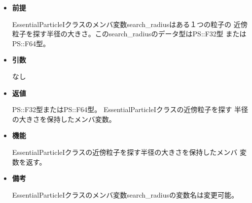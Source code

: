 \begin{itemize}

\item {\bf 前提}

  EssentialParticleIクラスのメンバ変数search\_radiusはある１つの粒子の
  近傍粒子を探す半径の大きさ。このsearch\_radiusのデータ型はPS::F32型
  またはPS::F64型。
  
\item {\bf 引数}

  なし
  
\item {\bf 返値}

  PS::F32型またはPS::F64型。 EssentialParticleIクラスの近傍粒子を探す
  半径の大きさを保持したメンバ変数。
  
\item {\bf 機能}

  EssentialParticleIクラスの近傍粒子を探す半径の大きさを保持したメンバ
  変数を返す。

\item {\bf 備考}

  EssentialParticleIクラスのメンバ変数search\_radiusの変数名は変更可能。
  
\end{itemize}
